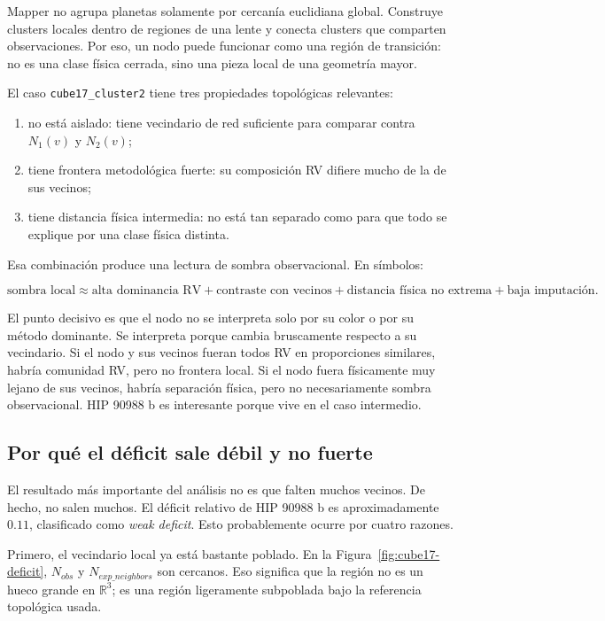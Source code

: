 \documentclass[11pt]{article}
\begin{document}
Mapper no agrupa planetas solamente por cercanía euclidiana global. Construye clusters locales dentro de regiones de una lente y conecta clusters que comparten observaciones. Por eso, un nodo puede funcionar como una región de transición: no es una clase física cerrada, sino una pieza local de una geometría mayor.

El caso \texttt{cube17\_cluster2} tiene tres propiedades topológicas relevantes:

\begin{enumerate}
    \item no está aislado: tiene vecindario de red suficiente para comparar contra $N_1(v)$ y $N_2(v)$;
    \item tiene frontera metodológica fuerte: su composición RV difiere mucho de la de sus vecinos;
    \item tiene distancia física intermedia: no está tan separado como para que todo se explique por una clase física distinta.
\end{enumerate}

Esa combinación produce una lectura de sombra observacional. En símbolos:

\[
\text{sombra local}
\approx
\text{alta dominancia RV}
+
\text{contraste con vecinos}
+
\text{distancia física no extrema}
+
\text{baja imputación}.
\]

El punto decisivo es que el nodo no se interpreta solo por su color o por su método dominante. Se interpreta porque cambia bruscamente respecto a su vecindario. Si el nodo y sus vecinos fueran todos RV en proporciones similares, habría comunidad RV, pero no frontera local. Si el nodo fuera físicamente muy lejano de sus vecinos, habría separación física, pero no necesariamente sombra observacional. HIP 90988 b es interesante porque vive en el caso intermedio.

\subsection{Por qué el déficit sale débil y no fuerte}

El resultado más importante del análisis no es que falten muchos vecinos. De hecho, no salen muchos. El déficit relativo de HIP 90988 b es aproximadamente $0.11$, clasificado como \emph{weak deficit}. Esto probablemente ocurre por cuatro razones.

Primero, el vecindario local ya está bastante poblado. En la Figura~\ref{fig:cube17-deficit}, $N_{obs}$ y $N_{exp\_neighbors}$ son cercanos. Eso significa que la región no es un hueco grande en $\mathbb{R}^3$; es una región ligeramente subpoblada bajo la referencia topológica usada.
\end{document}
